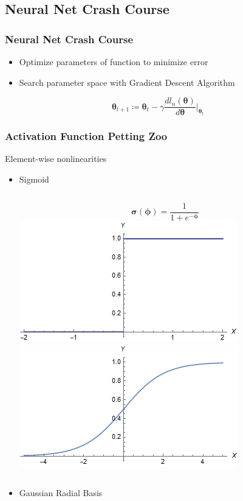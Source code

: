 \documentclass[pdf]{beamer}
\begin{document}
\subsection{Neural Net Crash Course}
\begin{frame}[t]
  \frametitle{Neural Net Crash Course}
  \begin{itemize}
  \item Optimize parameters of function to minimize error
  \item Search parameter space with Gradient Descent Algorithm
  \end{itemize}
  \[ \boldsymbol{\theta}_{t+1} \coloneqq \boldsymbol{\theta}_t-\gamma \frac{dl_n(\boldsymbol{\theta})}{d\boldsymbol{\theta}}\Big|_{\boldsymbol{\theta}_t} \]
\end{frame}

\begin{frame}
  \frametitle{Activation Function Petting Zoo}
  Element-wise nonlinearities
  \begin{itemize}
  \item Sigmoid
    \begin{columns}
      \[\boldsymbol{\sigma}(\boldsymbol{\phi})=\frac{1}{1+e^{-\boldsymbol{\phi}}}  \]
       \includegraphics[scale=0.15]{Step.png}
       \includegraphics[scale=0.15]{Sigmoid.png}
    \end{columns}
  \item Gaussian Radial Basis

\end{itemize}
\end{frame}
\end{document}
